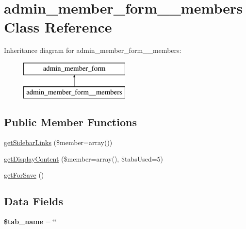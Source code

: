 \hypertarget{classadmin__member__form____members}{\section{admin\-\_\-member\-\_\-form\-\_\-\-\_\-members Class Reference}
\label{classadmin__member__form____members}
}
Inheritance diagram for admin\-\_\-member\-\_\-form\-\_\-\-\_\-members\-:\begin{figure}[H]
\begin{center}
\leavevmode
\includegraphics[height=2.000000cm]{classadmin__member__form____members}
\end{center}
\end{figure}
\subsection*{Public Member Functions}
\begin{DoxyCompactItemize}
\item 
\hyperlink{classadmin__member__form____members_aa06c25b69a518bbb6eaaaf6a84047f04}{get\-Sidebar\-Links} (\$member=array())
\item 
\hyperlink{classadmin__member__form____members_af3da842ede1e6d212629fd0eda2bfbcc}{get\-Display\-Content} (\$member=array(), \$tabs\-Used=5)
\item 
\hyperlink{classadmin__member__form____members_aa584200e117d7f02d4fabc05b109e51f}{get\-For\-Save} ()
\end{DoxyCompactItemize}
\subsection*{Data Fields}
\begin{DoxyCompactItemize}
\item 
\hypertarget{classadmin__member__form____members_a924f0502d852ff2259cef00e4fa12d94}{{\bfseries \$tab\-\_\-name} = \char`\"{}\char`\"{}}\label{classadmin__member__form____members_a924f0502d852ff2259cef00e4fa12d94}

\end{DoxyCompactItemize}


